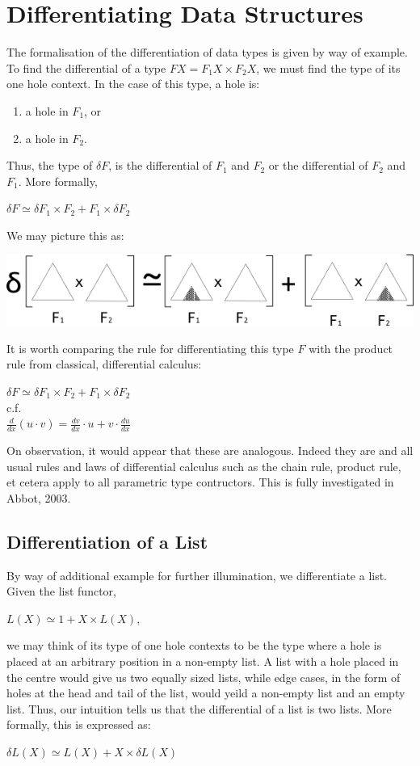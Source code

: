 \documentclass[12pt]{report}
\begin{document}
\section{Differentiating Data Structures}
The formalisation of the differentiation of data types is given by way of example. To find the differential of a type $FX = F_{1}X \times F_{2}X$, we must find the type of its one hole context. In the case of this type, a hole is:
\begin{enumerate}
\item a hole in $F_{1}$, or
\item a hole in $F_{2}$.
\end{enumerate}
Thus, the type of $\delta F$, is the differential of $F_{1}$ and $F_{2}$ or the differential of $F_{2}$ and $F_{1}$. More formally,
\begin{center}
$\delta F \simeq \delta F_{1} \times F_{2} + F_{1} \times \delta F_{2} $
\end{center}
We may picture this as:
\begin{center}
\includegraphics[scale=0.8]{6.png}
\end{center}
It is worth comparing the rule for differentiating this type $F$ with the product rule from classical, differential calculus:
\begin{center}
$\delta F \simeq \delta F_{1} \times F_{2} + F_{1} \times \delta F_{2} $\\
c.f.\\
$\frac{d}{dx} (u \cdot v)= \frac{dv}{dx} \cdot u + v \cdot \frac{du}{dx}$
\end{center} 
On observation, it would appear that these are analogous. Indeed they are and all usual rules and laws of differential calculus such as the chain rule, product rule, et cetera apply to all parametric type contructors. This is fully investigated in Abbot, 2003\cite{coc}.
\subsection{Differentiation of a List}
By way of additional example for further illumination, we differentiate a list. Given the list functor,
\begin{center}
$L(X) \simeq 1 + X \times L(X)$,
\end{center} 
we may think of its type of one hole contexts to be the type where a hole is placed at an arbitrary position in a non-empty list. A list with a hole placed in the centre would give us two equally sized lists, while edge cases, in the form of holes at the head and tail of the list, would yeild a non-empty list and an empty list. Thus, our intuition tells us that the differential of a list is two lists. More formally, this is expressed as:
\begin{center}
$\delta L(X) \simeq L(X) + X \times \delta L(X)$
\end{center}
\end{document}
